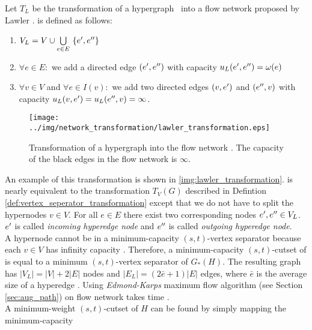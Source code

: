 \begin{definition}
Let $T_L$ be the transformation of a hypergraph \HypergraphDef~into 
a flow network  proposed by Lawler \cite{lawler1973}.  is defined as follows:
\begin{enumerate}
\item $V_L = V \cup \bigcup\limits_{e \in E}\ \{\incoming{e}, \outgoing{e}\}$
\item $\forall e \in E:$ we add a directed edge $(e',e'')$ 
      with capacity $u_L(e',e'') = \omega(e)$
\item $\forall v \in V$ and $\forall e \in I(v):$ we add two directed edges $(v, e')$ and 
      $(e'', v)$ with capacity $u_L(v, e') = u_L(e'',v) = \infty$.
\end{enumerate} 
\end{definition}
\begin{figure}
\centering
\texttt{[image: ../img/network\_transformation/lawler\_transformation.eps]}
\caption{Transformation of a hypergraph into the flow network  \cite{lawler1973}. The
capacity of the black edges in the flow network is $\infty$.}
\label{img:lawler_transformation}
\end{figure}
An example of this transformation is shown in \autoref{img:lawler_transformation}.
 is nearly equivalent to the transformation $T_V(G)$ described in Defintion \autoref{def:vertex_seperator_transformation}
except that we do not have to split the hypernodes $v \in V$.
For all $e \in E$ there exist two corresponding nodes $e',e'' \in V_L$. $e'$ 
is called \emph{incoming hyperedge node} and $e''$ is called \emph{outgoing hyperedge node}. \\
A hypernode cannot be in a minimum-capacity $(s,t)$-vertex separator because each $v \in V$ has
infinity capacity \cite{HuMoerder85}. Therefore, a minimum-capacity $(s,t)$-cutset 
of  is equal to a minimum $(s,t)$-vertex separator of $G_*(H)$.
The resulting graph  has $|V_L| = |V| + 2|E|$ nodes and $|E_L| = (2\bar{e}+1)|E|$ edges, where
$\bar{e}$ is the average size of a hyperedge \cite{pistorius2003}. Using \emph{Edmond-Karps}
maximum flow algorithm (see Section \ref{sec:aug_path}) on flow network  
takes time  \cite{lawler1973}. \\
A minimum-weight $(s,t)$-cutset of $H$ can be found by simply mapping the minimum-capacity
